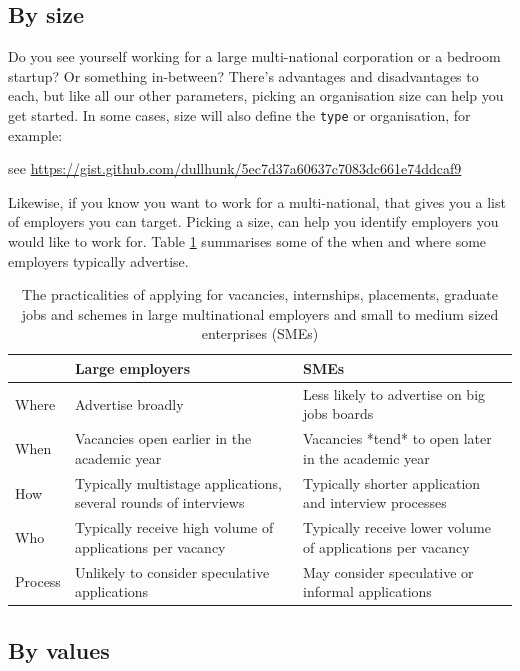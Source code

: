 \documentclass[
]{book}
\begin{document}
\hypertarget{by-size}{%
\subsection{By size}\label{by-size}}

Do you see yourself working for a large multi-national corporation or a bedroom startup? Or something in-between? There's advantages and disadvantages to each, but like all our other parameters, picking an organisation size can help you get started. In some cases, size will also define the \texttt{type} or organisation, for example:

see \url{https://gist.github.com/dullhunk/5ec7d37a60637c7083dc661e74ddcaf9}

Likewise, if you know you want to work for a multi-national, that gives you a list of employers you can target. Picking a size, can help you identify employers you would like to work for. Table \ref{tab:shortcuts} summarises some of the when and where some employers typically advertise.

\begin{table}

\caption{\label{tab:shortcuts}The practicalities of applying for vacancies, internships, placements, graduate jobs and schemes in large multinational employers and small to medium sized enterprises (SMEs)}
\centering
\begin{tabular}[t]{lll}
\toprule
 & Large employers & SMEs\\
\midrule
Where & Advertise broadly & Less likely to advertise on big jobs boards\\
When & Vacancies open earlier in the academic year & Vacancies *tend* to open later in the academic year\\
How & Typically multistage applications, several rounds of interviews & Typically shorter application and interview processes\\
Who & Typically receive high volume of applications per vacancy & Typically receive lower volume of applications per vacancy\\
Process & Unlikely to consider speculative applications & May consider speculative or informal applications\\
\bottomrule
\end{tabular}
\end{table}

\hypertarget{by-values}{%
\subsection{By values}\label{by-values}}
\end{document}
